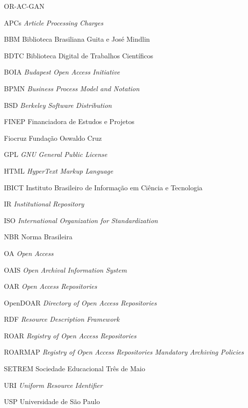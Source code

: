 \documentclass[diss]{template/setrem}
\begin{document}
\begin{listofabbrv}{OR-AC-GAN} %
  \item[APCs] {\emph{Article Processing Charges}}
  \item[BBM] {Biblioteca Brasiliana Guita e José Mindlin}
  \item[BDTC] {Biblioteca Digital de Trabalhos Científicos}
  \item[BOIA] {\emph{Budapest Open Access Initiative}}
  \item[BPMN] {\emph{Business Process Model and Notation}}
  \item[BSD] {\emph{Berkeley Software Distribution}}
  \item[FINEP] {Financiadora de Estudos e Projetos}
  \item[Fiocruz] {Fundação Oswaldo Cruz}
  \item[GPL] {\emph{GNU General Public License}}
  \item[HTML] {\emph{HyperText Markup Language}}
  \item[IBICT] {Instituto Brasileiro de Informação em Ciência e Tecnologia}
  \item[IR] {\emph{Institutional Repository}}
  \item[ISO] {\emph{International Organization for Standardization}}
  \item[NBR] {Norma Brasileira}
  \item[OA] {\emph{Open Access}}
  \item[OAIS] {\emph{Open Archival Information System}}
  \item[OAR] {\emph{Open Access Repositories}}
  \item[OpenDOAR] {\emph{Directory of Open Access Repositories}}
  \item[RDF] {\emph{Resource Description Framework }}
  \item[ROAR] {\emph{Registry of Open Access Repositories}}
  \item[ROARMAP] {\emph{Registry of Open Access Repositories Mandatory Archiving Policies}}
  \item[SETREM] {Sociedade Educacional Três de Maio}
  \item[URI] {\emph{Uniform Resource Identifier}}
  \item[USP] {Universidade de São Paulo}
\end{listofabbrv}

% 
\tableofcontents

\pagestyle{empty}
{
  
}


% 
% 


%


\end{document}
